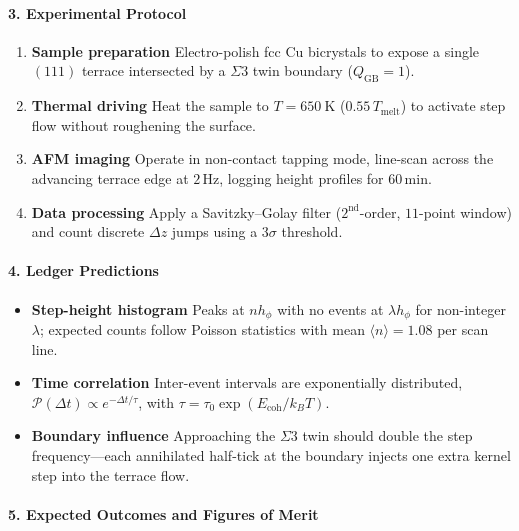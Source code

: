 \documentclass[11pt,oneside]{book}
\begin{document}
\paragraph*{3. Experimental Protocol}

\begin{enumerate}[label=\textbf{\arabic*.}, leftmargin=1.2cm]
\item \textbf{Sample preparation}  
      Electro-polish fcc Cu bicrystals to expose a single \((111)\)
      terrace intersected by a \(\Sigma3\) twin boundary
      (\(Q_{\text{GB}} = 1\)).
\item \textbf{Thermal driving}  
      Heat the sample to \(T=650~\text{K}\) (\(0.55\,T_\text{melt}\))
      to activate step flow without roughening the surface.
\item \textbf{AFM imaging}  
      Operate in non-contact tapping mode, line-scan across the
      advancing terrace edge at \(2\,\text{Hz}\),
      logging height profiles for \(60\,\text{min}\).
\item \textbf{Data processing}  
      Apply a Savitzky–Golay filter (\(2^{\text{nd}}\)-order, \(11\)-point
      window) and count discrete \(\Delta z\) jumps using a 3\(\sigma\)
      threshold.
\end{enumerate}

\paragraph*{4. Ledger Predictions}

\begin{itemize}
\item \textbf{Step-height histogram}  
      Peaks at \(n h_\phi\) with no events at \(\lambda h_\phi\) for
      non-integer \(\lambda\); expected counts follow Poisson statistics
      with mean \(\langle n\rangle = 1.08\) per scan line.
\item \textbf{Time correlation}  
      Inter-event intervals are exponentially distributed,
      \(\mathcal P(\Delta t) \propto e^{-\Delta t/\tau}\),
      with \(\tau = \tau_0\exp(E_{\text{coh}}/k_BT)\).
\item \textbf{Boundary influence}  
      Approaching the \(\Sigma3\) twin should double the step
      frequency—each annihilated half-tick at the boundary injects
      one extra kernel step into the terrace flow.
\end{itemize}

\paragraph*{5. Expected Outcomes and Figures of Merit}
\end{document}

